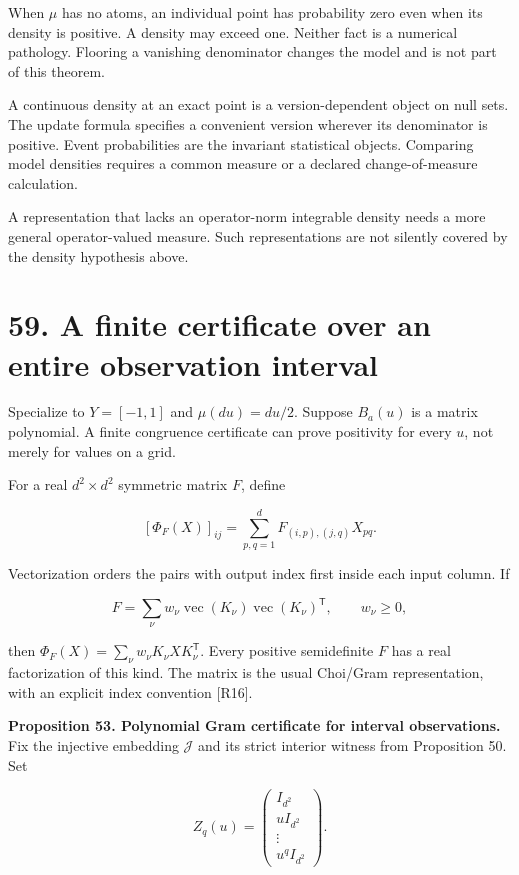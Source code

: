 \documentclass[11pt,letterpaper]{article}
\begin{document}
When \(\mu\) has no atoms, an individual point has probability zero even
when its density is positive. A density may exceed one. Neither fact is
a numerical pathology. Flooring a vanishing denominator changes the
model and is not part of this theorem.

A continuous density at an exact point is a version-dependent object on
null sets. The update formula specifies a convenient version wherever
its denominator is positive. Event probabilities are the invariant
statistical objects. Comparing model densities requires a common measure
or a declared change-of-measure calculation.

A representation that lacks an operator-norm integrable density needs a
more general operator-valued measure. Such representations are not
silently covered by the density hypothesis above.

\section{59. A finite certificate over an entire observation
interval}\label{a-finite-certificate-over-an-entire-observation-interval}

Specialize to \(Y=[-1,1]\) and \(\mu(du)=du/2\). Suppose \(B_a(u)\) is a
matrix polynomial. A finite congruence certificate can prove positivity
for every \(u\), not merely for values on a grid.

For a real \(d^2\times d^2\) symmetric matrix \(F\), define

\[
[\Phi_F(X)]_{ij}=\sum_{p,q=1}^d F_{(i,p),(j,q)}X_{pq}.
\]

Vectorization orders the pairs with output index first inside each input
column. If

\[
F=\sum_\nu w_\nu\operatorname{vec}(K_\nu)
\operatorname{vec}(K_\nu)^{\mathsf T},\qquad w_\nu\geq0,
\]

then \(\Phi_F(X)=\sum_\nu w_\nu K_\nu X K_\nu^{\mathsf T}\). Every
positive semidefinite \(F\) has a real factorization of this kind. The
matrix is the usual Choi/Gram representation, with an explicit index
convention {[}R16{]}.

\textbf{Proposition 53. Polynomial Gram certificate for interval
observations.} Fix the injective embedding \(\mathcal J\) and its strict
interior witness from Proposition 50. Set

\[
Z_q(u)=\begin{pmatrix}I_{d^2}\\uI_{d^2}\\\vdots\\u^qI_{d^2}\end{pmatrix}.
\]
\end{document}
